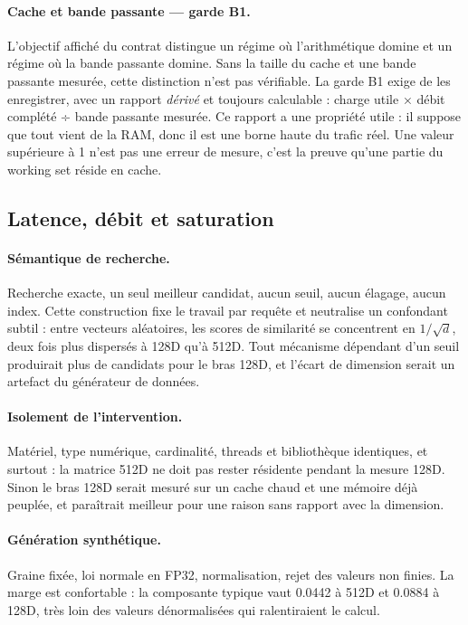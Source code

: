\documentclass[11pt,a4paper]{article}
\begin{document}
\paragraph{Cache et bande passante — garde B1.} L'objectif affiché du contrat
distingue un régime où l'arithmétique domine et un régime où la bande passante
domine. Sans la taille du cache et une bande passante mesurée, cette distinction
n'est pas vérifiable. La garde B1 exige de les enregistrer, avec un rapport
\emph{dérivé} et toujours calculable : charge utile × débit complété ÷ bande
passante mesurée. Ce rapport a une propriété utile : il suppose que tout vient de la
RAM, donc il est une borne haute du trafic réel. Une valeur supérieure à 1 n'est pas
une erreur de mesure, c'est la preuve qu'une partie du working set réside en cache.

\subsection{Latence, débit et saturation}\label{sec:saturation}

\paragraph{Sémantique de recherche.} Recherche exacte, un seul meilleur candidat,
aucun seuil, aucun élagage, aucun index. Cette construction fixe le travail par
requête et neutralise un confondant subtil : entre vecteurs aléatoires, les scores de
similarité se concentrent en $1/\sqrt{d}$, deux fois plus dispersés à 128D qu'à 512D.
Tout mécanisme dépendant d'un seuil produirait plus de candidats pour le bras 128D,
et l'écart de dimension serait un artefact du générateur de données.

\paragraph{Isolement de l'intervention.} Matériel, type numérique, cardinalité,
threads et bibliothèque identiques, et surtout : la matrice 512D ne doit pas rester
résidente pendant la mesure 128D. Sinon le bras 128D serait mesuré sur un cache
chaud et une mémoire déjà peuplée, et paraîtrait meilleur pour une raison sans
rapport avec la dimension.

\paragraph{Génération synthétique.} Graine fixée, loi normale en FP32, normalisation,
rejet des valeurs non finies. La marge est confortable : la composante typique vaut
\num{0,0442} à 512D et \num{0,0884} à 128D, très loin des valeurs dénormalisées qui
ralentiraient le calcul.
\end{document}
